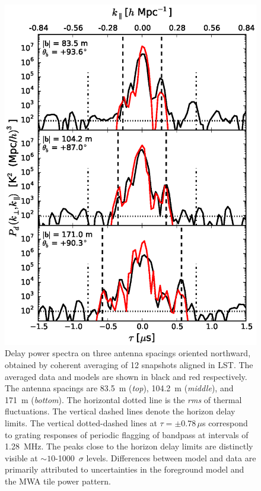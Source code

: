 \documentclass[preprint2,apjl,numberedappendix,twocolappendix,appendixfloats]{emulateapj}
\begin{document}
\begin{figure}[htb]
\centering
\includegraphics[width=\linewidth]{3_baseline_comparison_CLEAN_fhd_avg_visibilities_amplitudes_185.0_MHz_30.7_MHz.eps}
\caption{Delay power spectra on three antenna spacings oriented northward, obtained by coherent averaging of 12 snapshots aligned in LST. The averaged data and models are shown in black and red respectively. The antenna spacings are 83.5~m ({\it top}), 104.2~m ({\it middle}), and 171~m ({\it bottom}). The horizontal dotted line is the {\it rms} of thermal fluctuations. The vertical dashed lines denote the horizon delay limits. The vertical dotted-dashed lines at $\tau = \pm 0.78\,\mu$s correspond to grating responses of periodic flagging of bandpass at intervals of 1.28~MHz. The peaks close to the horizon delay limits are distinctly visible at $\sim 10$-1000~$\sigma$ levels. Differences between model and data are primarily attributed to uncertainties in the foreground model and the MWA tile power pattern. \label{fig:3-baseline-comparison-delay-spectra}}
\end{figure}
\end{document}
